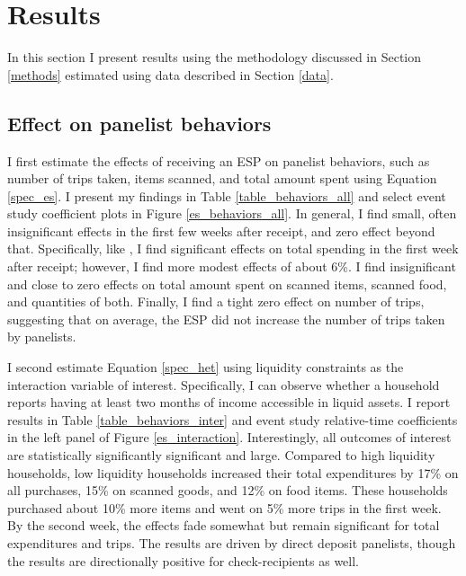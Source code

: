 \documentclass[12pt]{article}
\begin{document}

\section{Results} \label{results}

In this section I present results using the methodology discussed in Section \ref{methods} estimated using data described in Section \ref{data}.

\subsection{Effect on panelist behaviors}

I first estimate the effects of receiving an ESP on panelist behaviors, such as number of trips taken, items scanned, and total amount spent using Equation \ref{spec_es}.
I present my findings in Table \ref{table_behaviors_all} and select event study coefficient plots in Figure \ref{es_behaviors_all}.
In general, I find small, often insignificant effects in the first few weeks after receipt, and zero effect beyond that.
Specifically, like \textcite{broda2014economic}, I find significant effects on total spending in the first week after receipt; however, I find more modest effects of about 6\%.
I find insignificant and close to zero effects on total amount spent on scanned items, scanned food, and quantities of both.
Finally, I find a tight zero effect on number of trips, suggesting that on average, the ESP did not increase the number of trips taken by panelists.

I second estimate Equation \ref{spec_het} using liquidity constraints as the interaction variable of interest.
Specifically, I can observe whether a household reports having at least two months of income accessible in liquid assets.
I report results in Table \ref{table_behaviors_inter} and event study relative-time coefficients in the left panel of Figure \ref{es_interaction}.
Interestingly, all outcomes of interest are statistically significantly significant and large.
Compared to high liquidity households, low liquidity households increased their total expenditures by 17\% on all purchases, 15\% on scanned goods, and 12\% on food items.
These households purchased about 10\% more items and went on 5\% more trips in the first week.
By the second week, the effects fade somewhat but remain significant for total expenditures and trips.
The results are driven by direct deposit panelists, though the results are directionally positive for check-recipients as well.
\end{document}
